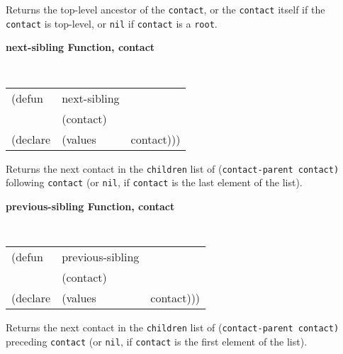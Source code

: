 \documentclass[twoside]{book}
\begin{document}
\begin{sloppy}
{\begin{flushright}
{}\end{flushright}}

\begin{flushright} \parbox[t]{6.125in}{
Returns the top-level ancestor of the {\tt contact}, or the {\tt contact} itself
if the {\tt contact} is top-level, or {\tt nil} if {\tt contact} is a {\tt root}. 

}\end{flushright}



{\samepage
{\large {\bf next-sibling \hfill Function, contact}} 
\begin{flushright} \parbox[t]{6.125in}{
\tt
\begin{tabular}{lll}
\raggedright
(defun & next-sibling & \\ 
& (contact) \\
(declare &(values  & contact)))
\end{tabular}
\rm

}\end{flushright}}

\begin{flushright} \parbox[t]{6.125in}{
Returns the next contact in the {\tt children} list of {(\tt contact-parent
contact)} following {\tt contact} (or {\tt nil}, if {\tt contact} is the last
element of the list).

}\end{flushright}

{\samepage
{\large {\bf previous-sibling \hfill Function, contact}} 
\begin{flushright} \parbox[t]{6.125in}{
\tt
\begin{tabular}{lll}
\raggedright
(defun & previous-sibling & \\ 
& (contact) \\
(declare &(values  & contact)))
\end{tabular}
\rm

}\end{flushright}}

\begin{flushright} \parbox[t]{6.125in}{
Returns the next contact in the {\tt children} list of {(\tt contact-parent
contact)} preceding {\tt contact} (or {\tt nil}, if {\tt contact} is the first
element of the list).

}\end{flushright}



\end{sloppy}
\end{document}
